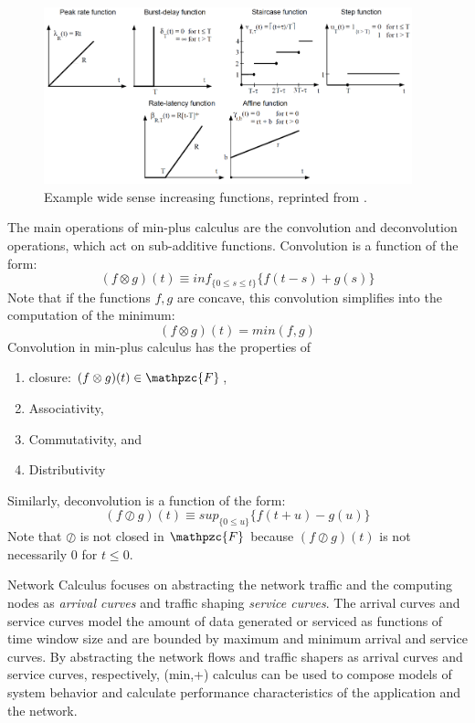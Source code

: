 \begin{figure}[htb]
	\centering
	\includegraphics[width=0.95\textwidth]{figs/wsi.png}
	\caption{Example wide sense increasing functions, reprinted from \cite{NCBook}.}
	\label{fig:wsi}
\end{figure}

The main operations of min-plus calculus are the convolution and deconvolution operations, which act on sub-additive functions.  Convolution is a function of the form:
\begin{equation}
(f\otimes g)(t)\equiv inf_{\{0\leq s \leq t\}}\{f(t-s)+g(s)\}
\end{equation}
Note that if the functions $f,g$ are concave, this convolution simplifies into the computation of the minimum: 
\begin{equation}
(f\otimes g)(t)=min(f,g)
\end{equation}
Convolution in min-plus calculus has the properties of 
\begin{enumerate}
	\item closure: $(f\otimes g)(t) \in \mathpzc{F}$,
	\item Associativity,
	\item Commutativity, and
	\item Distributivity
\end{enumerate}

Similarly, deconvolution is a function of the form:
\begin{equation} 
(f\oslash g)(t)\equiv sup_{\{0\leq u\}}\{f(t+u)-g(u)\}
\end{equation}
Note that $\oslash$ is not closed in $\mathpzc{F}$ because $(f\oslash g)(t)$ is not necessarily $0$ for $t\leq0$.

Network Calculus focuses on abstracting the network traffic and the
computing nodes as \textit{arrival curves} and traffic shaping
\textit{service curves}. The arrival curves and service curves model
the amount of data generated or serviced as functions of time window
size and are bounded by maximum and minimum arrival and service
curves.  By abstracting the network flows and traffic shapers as
arrival curves and service curves, respectively, (min,+) calculus can
be used to compose models of system behavior and calculate performance
characteristics of the application and the network.

